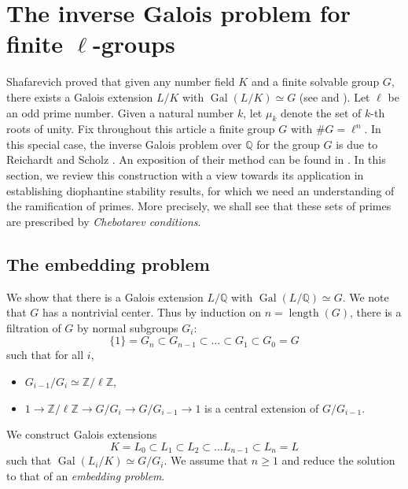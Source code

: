 \documentclass[11pt,reqno]{amsart}
\newcommand{\Z}{\mathbb{Z}}
\newcommand{\Q}{\mathbb{Q}}
\newcommand{\op}[1]{\operatorname{#1}}
\numberwithin{equation}{section}
\begin{document}
\section{ The inverse Galois problem for finite $\ell$-groups}\label{s 2}
\medskip 

\par Shafarevich proved that given any number field $K$ and a finite solvable group $G$, there exists a Galois extension $L/K$ with $\op{Gal}(L/K)\simeq G$ (see \cite{Shafarevich} and \cite[Chapter IX, Section 6]{NSW}). Let $\ell$ be an odd prime number. Given a natural number $k$, let $\mu_{k}$ denote the set of $k$-th roots of unity. Fix throughout this article a finite group $G$ with $\# G=\ell^n$. In this special case, the inverse Galois problem over $\Q$ for the group $G$ is due to Reichardt \cite{Reichardt} and Scholz \cite{Scholz}. An exposition of their method can be found in \cite{massey2006inverse}. In this section, we review this construction with a view towards its application in establishing diophantine stability results, for which we need an understanding of the ramification of primes. More precisely, we shall see that these sets of primes are prescribed by \emph{Chebotarev conditions}. \\

\subsection{The embedding problem}
We show that there is a Galois extension $L/\Q$ with $\op{Gal}(L/\Q)\simeq G$. We note that $G$ has a nontrivial center. Thus by induction on $n=\op{length}(G)$, there is a filtration of $G$ by normal subgroups $G_i$:
\begin{equation}\label{filtration on G}\{1\}=G_n\subset G_{n-1}\subset \dots \subset G_{1}\subset G_0=G\end{equation} such that for all $i$,
\begin{itemize}
    \item $G_{i-1}/G_{i}\simeq \Z/\ell\Z$,
    \item $1\to \Z/\ell\Z\to G/G_i\to G/G_{i-1}\to 1$ is a central extension of $G/G_{i-1}$. 
\end{itemize}
 We construct Galois extensions
\[K=L_0\subset L_1\subset L_2\subset \dots L_{n-1}\subset L_n=L\] such that $\op{Gal}(L_i/K)\simeq G/G_i$. We assume that $n\geq 1$ and reduce the solution to that of an \emph{embedding problem}.\\ 
\end{document}
